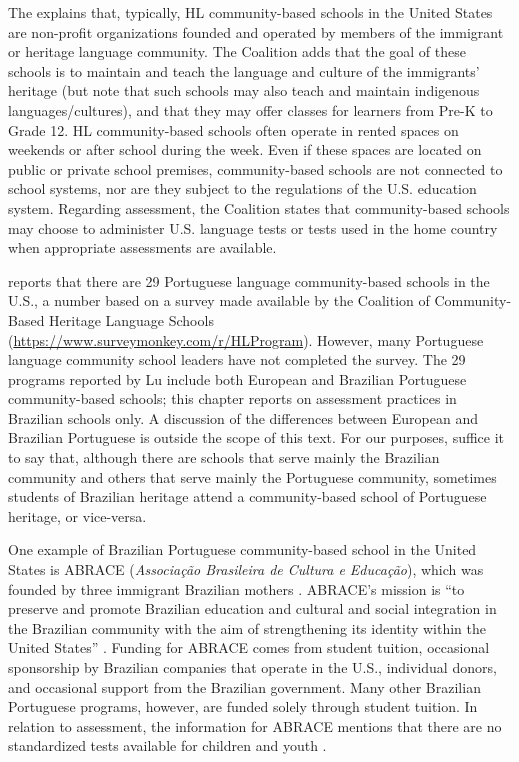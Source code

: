 \documentclass[output=paper]{langscibook}
\begin{document}
\begin{sloppypar}
The \citet{TheCoalitionofCommunity-BasedHeritageLanguageSchools2018} explains that, typically, HL community-based schools in the United States are non-profit organizations founded and operated by members of the immigrant or heritage language community. The Coalition adds that the goal of these schools is to maintain and teach the language and culture of the immigrants’ heritage (but note that such schools may also teach and maintain indigenous languages/cultures), and that they may offer classes for learners from Pre-K to Grade 12. HL community-based schools often operate in rented spaces on weekends or after school during the week. Even if these spaces are located on public or private school premises, community-based schools are not connected to school systems, nor are they subject to the regulations of the U.S. education system. Regarding assessment, the Coalition states that community-based schools may choose to administer U.S. language tests or tests used in the home country when appropriate assessments are available.
\end{sloppypar}

\begin{sloppypar}
\citet{Lu2020} reports that there are 29 Portuguese language community-based schools in the U.S., a number based on a survey made available by the Coalition of Community-Based Heritage Language Schools (\url{https://www.surveymonkey.com/r/HLProgram}). However, many Portuguese language community school leaders have not completed the survey. The 29 programs reported by Lu include both European and Brazilian Portuguese community-based schools; this chapter reports on assessment practices in Brazilian schools only. A discussion of the differences between European and Brazilian Portuguese is outside the scope of this text. For our purposes, suffice it to say that, although there are schools that serve mainly the Brazilian community and others that serve mainly the Portuguese community, sometimes students of Brazilian heritage attend a community-based school of Portuguese heritage, or vice-versa.
\end{sloppypar}

\begin{sloppypar}
One example of Brazilian Portuguese community-based school in the United States is ABRACE (\textit{Associação Brasileira de Cultura e Educação}), which was founded by three immigrant Brazilian mothers \citep{CenterforAppliedLinguistcs2013,ABRACE2020}. ABRACE’s mission is “to preserve and promote Brazilian education and cultural and social integration in the Brazilian community with the aim of strengthening its identity within the United States” \citep{CenterforAppliedLinguistcs2013}. Funding for ABRACE comes from student tuition, occasional sponsorship by Brazilian companies that operate in the U.S., individual donors, and occasional support from the Brazilian government. Many other Brazilian Portuguese programs, however, are funded solely through student tuition. In relation to assessment, the information for ABRACE mentions that there are no standardized tests available for children and youth \citep{CenterforAppliedLinguistcs2013}.
\end{sloppypar}
\end{document}
